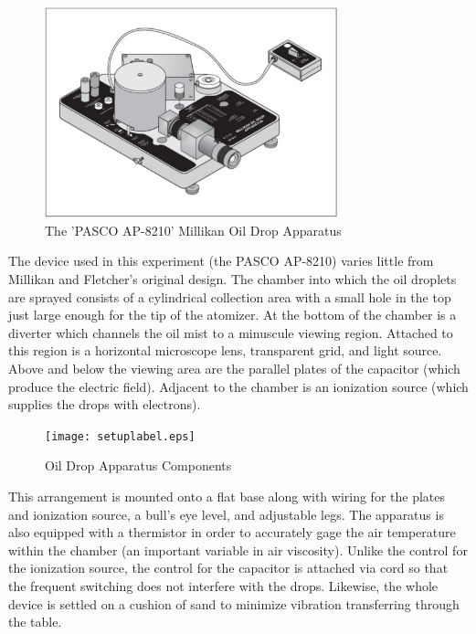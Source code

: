 \documentclass[twocolumn,secnumarabic,amssymb, nobibnotes, aps, pra]{revtex4}
\begin{document}
\begin{figure} [h]  %
\begin{center}
\includegraphics[width=85mm]{setup.pdf} 
\end{center}
\caption{The 'PASCO AP-8210' Millikan Oil Drop Apparatus}
\label{fig:setup}
\end{figure}

The device used in this experiment (the PASCO AP-8210) varies little from Millikan and Fletcher's original design. The chamber into which the oil droplets are sprayed consists of a cylindrical collection area with a small hole in the top just large enough for the tip of the atomizer. At the bottom of the chamber is a diverter which channels the oil mist to a minuscule viewing region. Attached to this region is a horizontal microscope lens, transparent grid, and light source. Above and below the viewing area are the parallel plates of the capacitor (which produce the electric field). Adjacent to the chamber is an ionization source (which supplies the drops with electrons).

\begin{figure} [h] 
\begin{center}
\texttt{[image: setuplabel.eps]} 
\end{center}
\caption{Oil Drop Apparatus Components}
\label{fig:label}
\end{figure}

This arrangement is mounted onto a flat base along with wiring for the plates and ionization source, a bull's eye level, and adjustable legs. The apparatus is also equipped with a thermistor in order to accurately gage the air temperature within the chamber (an important variable in air viscosity). Unlike the control for the ionization source, the control for the capacitor is attached via cord so that the frequent switching does not interfere with the drops. Likewise, the whole device is settled on a cushion of sand to minimize vibration transferring through the table. 
\end{document}
